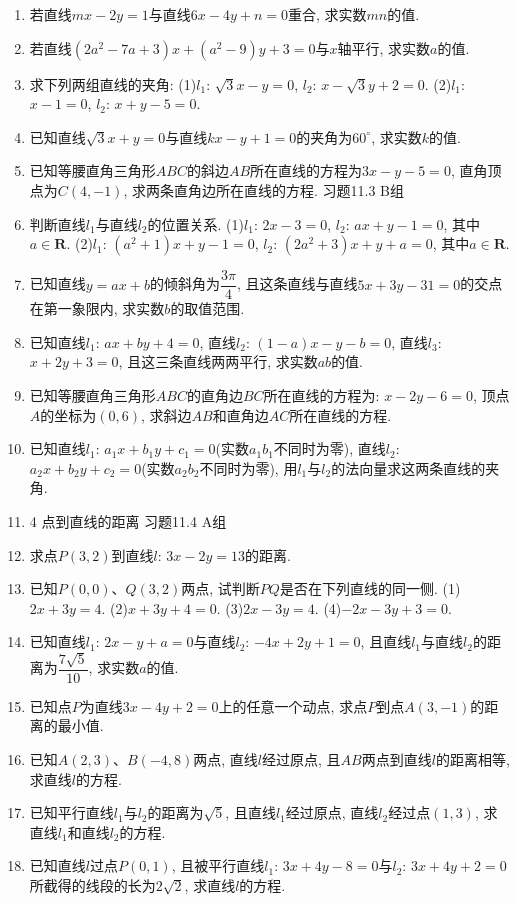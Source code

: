 \documentclass[10pt,a4paper]{article}
\begin{document}
\begin{enumerate}[1.]
\item 若直线$mx-2y=1$与直线$6x-4y+n=0$重合, 求实数$mn$的值.
\item 若直线$(2a^2-7a+3)x+(a^2-9)y+3=0$与$x$轴平行, 求实数$a$的值.
\item 求下列两组直线的夹角:
(1)$l_1$: $\sqrt 3x-y=0$, $l_2$: $x-\sqrt 3y+2=0$.
(2)$l_1$: $x-1=0$, $l_2$: $x+y-5=0$.
\item 已知直线$\sqrt 3x+y=0$与直线$kx-y+1=0$的夹角为$60^{\circ }$, 求实数$k$的值.
\item 已知等腰直角三角形$ABC$的斜边$AB$所在直线的方程为$3x-y-5=0$, 直角顶点为$C(4,-1)$, 求两条直角边所在直线的方程.
习题11.3  B组
\item 判断直线$l_1$与直线$l_2$的位置关系.
(1)$l_1$: $2x-3=0$, $l_2$: $ax+y-1=0$, 其中$a\in \mathbf{R}$.
(2)$l_1$: $(a^2+1)x+y-1=0$, $l_2$: $(2a^2+3)x+y+a=0$, 其中$a\in \mathbf{R}$.
\item 已知直线$y=ax+b$的倾斜角为$\dfrac{3\pi }4$, 且这条直线与直线$5x+3y-31=0$的交点在第一象限内, 求实数$b$的取值范围.
\item 已知直线$l_1$: $ax+by+4=0$, 直线$l_2$: $(1-a)x-y-b=0$, 直线$l_3$: $x+2y+3=0$, 且这三条直线两两平行, 求实数$ab$的值.
\item 已知等腰直角三角形$ABC$的直角边$BC$所在直线的方程为: $x-2y-6=0$, 顶点$A$的坐标为$(0,6)$, 求斜边$AB$和直角边$AC$所在直线的方程.
\item 已知直线$l_1$: $a_1x+b_1y+c_1=0$(实数$a_1b_1$不同时为零), 直线$l_2$: $a_2x+b_2y+c_2=0$(实数$a_2b_2$不同时为零), 用$l_1$与$l_2$的法向量求这两条直线的夹角.
\item 4  点到直线的距离
习题11.4  A组
\item 求点$P(3,2)$到直线$l$: $3x-2y=13$的距离.
\item 已知$P(0,0)$、$Q(3,2)$两点, 试判断$PQ$是否在下列直线的同一侧.
(1)$2x+3y=4$.						(2)$x+3y+4=0$.
(3)$2x-3y=4$.						(4)$-2x-3y+3=0$.
\item 已知直线$l_1$: $2x-y+a=0$与直线$l_2$: $-4x+2y+1=0$, 且直线$l_1$与直线$l_2$的距离为$\dfrac{7\sqrt 5}{10}$, 求实数$a$的值.
\item 已知点$P$为直线$3x-4y+2=0$上的任意一个动点, 求点$P$到点$A(3,-1)$的距离的最小值.
\item 已知$A(2,3)$、$B(-4,8)$两点, 直线$l$经过原点, 且$AB$两点到直线$l$的距离相等, 求直线$l$的方程.
\item 已知平行直线$l_1$与$l_2$的距离为$\sqrt 5$, 且直线$l_1$经过原点, 直线$l_2$经过点$(1,3)$, 求直线$l_1$和直线$l_2$的方程.
\item 已知直线$l$过点$P(0,1)$, 且被平行直线$l_1$: $3x+4y-8=0$与$l_2$: $3x+4y+2=0$所截得的线段的长为$2\sqrt 2$, 求直线$l$的方程.

\end{enumerate}
\end{document}
